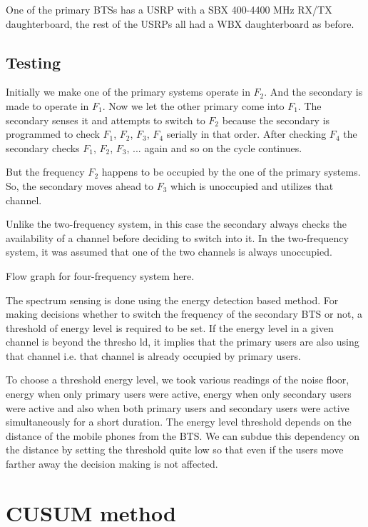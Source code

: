 One of the primary BTSs has a USRP with a SBX 400-4400 MHz RX/TX 
daughterboard, the rest of the USRPs all had a WBX daughterboard as before.

\subsection{Testing}

Initially we make one of the primary systems operate in $F_2$. And the 
secondary is made to operate in $F_1$. Now we let the other primary come into 
$F_1$. The secondary senses it and attempts to switch to $F_2$ because the 
secondary is programmed to check $F_1$, $F_2$, $F_3$, $F_4$ serially in that 
order. After checking $F_4$ the secondary checks $F_1$, $F_2$, $F_3$, ... 
again and so on the cycle continues.

But the frequency $F_2$ happens to be occupied by the one of the primary 
systems. So, the secondary moves ahead to $F_3$ which is unoccupied and 
utilizes that channel.

Unlike the two-frequency system, in this case the secondary always checks 
the availability of a channel before deciding to switch into it. In the 
two-frequency system, it was assumed that one of the two channels is always
unoccupied.

Flow graph for four-frequency system here.

The spectrum sensing is done using the energy detection based method. For 
making decisions whether to switch the frequency of the secondary BTS or not, 
a threshold of energy level is required to be set. If the energy level in a 
given channel is beyond the thresho ld, it implies that the primary users are
also using that channel i.e. that channel is already occupied by primary 
users.

To choose a threshold energy level, we took various readings of the noise 
floor, energy when only primary users were active, energy when only secondary 
users were active and also when both primary users and secondary users were 
active simultaneously for a short duration. The energy level threshold depends
on the distance of the mobile phones from the BTS. We can subdue this 
dependency on the distance by setting the threshold quite low so that even if
the users move farther away the decision making is not affected.

\section{CUSUM method}

